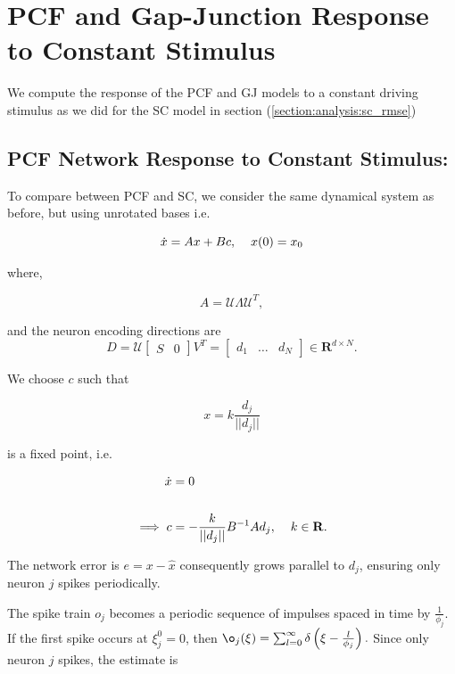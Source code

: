 \section{PCF and Gap-Junction Response to Constant Stimulus}

We compute the response of the PCF and GJ models to a constant driving stimulus as we did for the SC model in section (\ref{section:analysis:sc_rmse})
 
\subsection{PCF Network Response to Constant Stimulus:}
To compare between PCF and SC, we consider the same dynamical system as before, but using unrotated bases i.e.

$$
\dot{x} = Ax + Bc, \hspace{4mm} x(0) = x_0
$$

where,

$$
A = \mathcal{U} \Lambda \mathcal{U}^T,
$$

and the neuron encoding directions are 
$$
D = \mathcal{U} \begin{bmatrix} S & 0 \end{bmatrix} V^T = \begin{bmatrix} d_1 & \hdots & d_N \end{bmatrix} \in \mathbf{R}^{d \times N}.
$$


We choose $c$ such that 

$$
x = k \frac{d_j}{||d_j||}
$$

is a fixed point, i.e. 


\begin{align*}
\dot{x} &= 0
\\
\\
\implies
c &= -\frac{k}{||d_j||} B^{-1}A d_j,  \hspace{4mm} k \in \mathbf{R}.
\end{align*}

The network error is $e = x - \hat{x}$ consequently grows parallel to $d_j$, ensuring only neuron $j$ spikes periodically.

The spike train $o_j$ becomes a periodic sequence of impulses spaced in time by $\frac{1}{\phi_j}$. If the first spike occurs at $\xi_j^0 = 0$, then $\o_j(\xi) = \sum_{l=0}^{\infty} \delta \left(\xi-\frac{l}{\phi_j}\right).$ Since only neuron $j$ spikes, the estimate is

